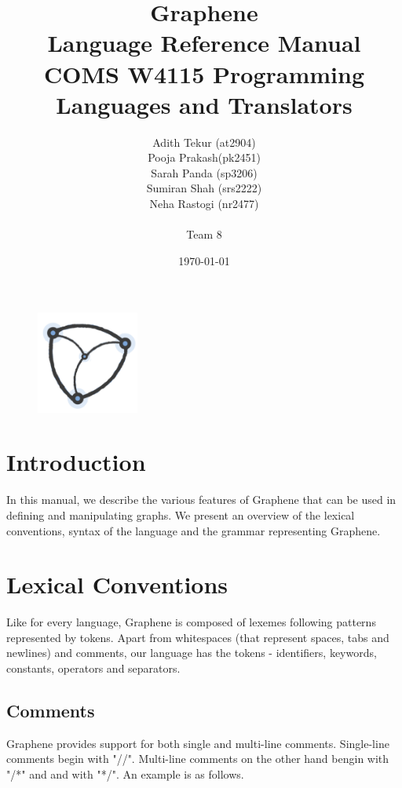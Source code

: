 \documentclass[a4paper]{article}
\title{\huge{Graphene}	\\	\LARGE{Language Reference Manual} \\ \large{COMS W4115 Programming Languages and Translators}}
\author{Adith Tekur (at2904)\\ Pooja Prakash(pk2451)\\ Sarah Panda (sp3206)\\ Sumiran Shah (srs2222)\\ Neha Rastogi (nr2477)\\ \\
Team 8}
\date{\today}
\begin{document}
\thispagestyle{empty}
\begin{large}
\begin{figure}
\centering
\includegraphics[width=0.3\textwidth]{graph-logo.png}
\end{figure}
\newpage
\maketitle
\newpage
\tableofcontents
\maketitle

\pagebreak
\clearpage
{}
\setcounter{page}{1}
\section{Introduction}

	In this manual, we describe the various features of Graphene that can be used in defining and manipulating graphs. We present an overview of the lexical conventions, syntax of the language and the grammar representing Graphene.

\section{Lexical Conventions}

Like for every language, Graphene is composed of lexemes following patterns represented by tokens. Apart from whitespaces (that represent spaces, tabs and newlines) and comments, our language has the tokens - identifiers, keywords, constants, operators and separators.


\subsection{Comments}

Graphene provides support for both single and multi-line comments. Single-line comments begin with "//". Multi-line comments on the other hand bengin with "/*" and and with "*/". An example is as follows.


\end{large}
\end{document}
